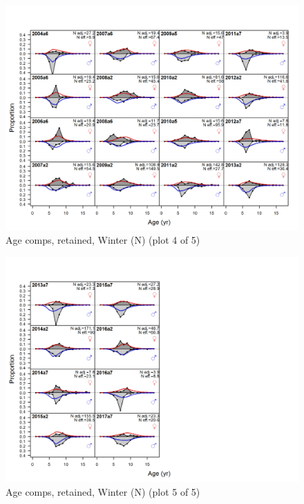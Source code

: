 \documentclass[12pt,]{article}
\begin{document}
\begin{figure}
\centering
\includegraphics{r4ss/plots_mod1/comp_agefit_flt1mkt2_page4.png}
\caption{Age comps, retained, Winter (N) (plot 4 of 5)
\label{fig:age_fits}}
\end{figure}

\begin{figure}
\centering
\includegraphics{r4ss/plots_mod1/comp_agefit_flt1mkt2_page5.png}
\caption{Age comps, retained, Winter (N) (plot 5 of 5)
\label{fig:age_fits}}
\end{figure}
\end{document}
